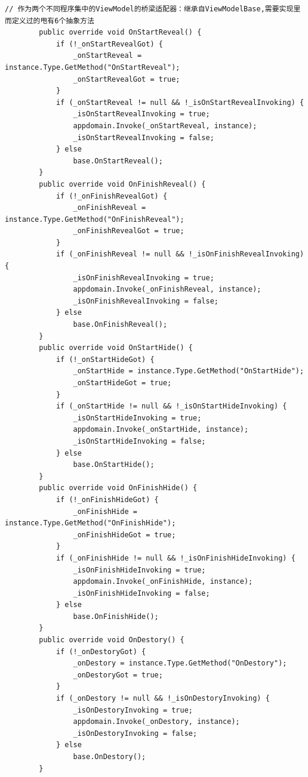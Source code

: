 \documentclass[9pt, b5paper]{article}
\begin{document}
\begin{verbatim}
// 作为两个不同程序集中的ViewModel的桥梁适配器：继承自ViewModelBase,需要实现里而定义过的甩有6个抽象方法
        public override void OnStartReveal() {
            if (!_onStartRevealGot) {
                _onStartReveal = instance.Type.GetMethod("OnStartReveal");
                _onStartRevealGot = true;
            }
            if (_onStartReveal != null && !_isOnStartRevealInvoking) {
                _isOnStartRevealInvoking = true;
                appdomain.Invoke(_onStartReveal, instance);
                _isOnStartRevealInvoking = false;
            } else 
                base.OnStartReveal();
        }
        public override void OnFinishReveal() {
            if (!_onFinishRevealGot) {
                _onFinishReveal = instance.Type.GetMethod("OnFinishReveal");
                _onFinishRevealGot = true;
            }
            if (_onFinishReveal != null && !_isOnFinishRevealInvoking) {
                _isOnFinishRevealInvoking = true;
                appdomain.Invoke(_onFinishReveal, instance);
                _isOnFinishRevealInvoking = false;
            } else 
                base.OnFinishReveal();
        }
        public override void OnStartHide() {
            if (!_onStartHideGot) {
                _onStartHide = instance.Type.GetMethod("OnStartHide");
                _onStartHideGot = true;
            }
            if (_onStartHide != null && !_isOnStartHideInvoking) {
                _isOnStartHideInvoking = true;
                appdomain.Invoke(_onStartHide, instance);
                _isOnStartHideInvoking = false;
            } else 
                base.OnStartHide();
        }
        public override void OnFinishHide() {
            if (!_onFinishHideGot) {
                _onFinishHide = instance.Type.GetMethod("OnFinishHide");
                _onFinishHideGot = true;
            }
            if (_onFinishHide != null && !_isOnFinishHideInvoking) {
                _isOnFinishHideInvoking = true;
                appdomain.Invoke(_onFinishHide, instance);
                _isOnFinishHideInvoking = false;
            } else 
                base.OnFinishHide();
        }
        public override void OnDestory() {
            if (!_onDestoryGot) {
                _onDestory = instance.Type.GetMethod("OnDestory");
                _onDestoryGot = true;
            }
            if (_onDestory != null && !_isOnDestoryInvoking) {
                _isOnDestoryInvoking = true;
                appdomain.Invoke(_onDestory, instance);
                _isOnDestoryInvoking = false;
            } else 
                base.OnDestory();
        }

\end{verbatim}
\end{document}
